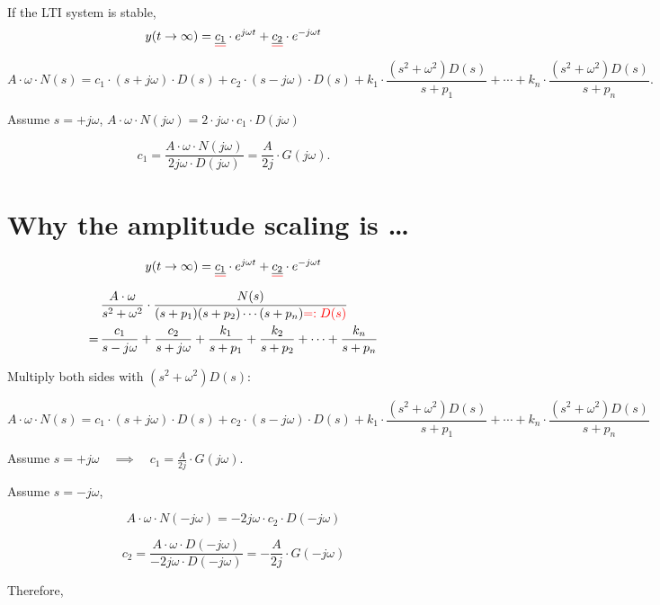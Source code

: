 \documentclass[
  letterpaper,
  DIV=11,
  numbers=noendperiod,
  oneside]{scrreprt}
\begin{document}
If the LTI system is stable,
\[y(t \to \infty) = \color{red}\underline{\underline{\color{black}c_1}} \color{black} \cdot e^{j\omega t} + \color{red}\underline{\underline{\color{black}c_2}} \color{black} \cdot e^{-j\omega t}\]

\[ A \cdot \omega \cdot N(s) = c_1 \cdot (s+j\omega) \cdot D(s) + c_2 \cdot (s-j\omega) \cdot D(s) + k_1 \cdot \frac{(s^2+\omega^2) D(s)}{s+p_1} + \cdots + k_n \cdot \frac{(s^2+\omega^2) D(s)}{s+p_n} .\]

Assume \(s=+j\omega\),
\(A \cdot \omega \cdot N(j\omega) = 2 \cdot j\omega \cdot c_1 \cdot D(j\omega)\)

\[c_1 = \frac{A \cdot \omega \cdot N(j\omega)}{2j\omega \cdot D(j\omega)} = \frac{A}{2j} \cdot G(j\omega) .\]

\section{Why the amplitude scaling is
\ldots{}}\label{why-the-amplitude-scaling-is}

\[y(t \to \infty) = \color{red}\underline{\underline{\color{black}c_1}} \color{black} \cdot e^{j\omega t} + \color{red}\underline{\underline{\color{black}c_2}} \color{black} \cdot e^{-j\omega t}\]

\begin{align*}
    &\, \frac{A \cdot \omega}{s^2+\omega^2} \cdot \frac{N(s)}{(s+p_1)(s+p_2) \cdots (s+p_n) \color{red}{=: D(s)}} \\
    =&\, \frac{c_1}{s-j\omega} + \frac{c_2}{s+j\omega} + \frac{k_1}{s+p_1} + \frac{k_2}{s+p_2} + \cdots + \frac{k_n}{s+p_n}
\end{align*}

{Multiply both sides with \((s^2+\omega^2) D(s)\):}

\[ A \cdot \omega \cdot N(s) = c_1 \cdot (s+j\omega) \cdot D(s) + c_2 \cdot (s-j\omega) \cdot D(s) + k_1 \cdot \frac{(s^2+\omega^2) D(s)}{s+p_1} + \cdots + k_n \cdot \frac{(s^2+\omega^2) D(s)}{s+p_n} \]

Assume
\(s=+j\omega\quad \implies \quad c_1 = \displaystyle \frac{A}{2j} \cdot G(j\omega)\).

Assume \(s=-j\omega\),

\[A \cdot \omega \cdot N(-j\omega) = -2j\omega \cdot c_2 \cdot D(-j\omega)\]

\[c_2 = \frac{A \cdot \omega \cdot D(-j\omega)}{-2j\omega \cdot D(-j\omega)} = -\frac{A}{2j} \cdot G(-j\omega)\]

Therefore,
\end{document}
